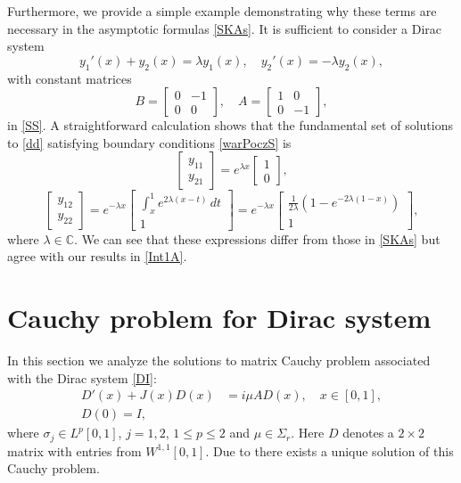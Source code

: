 \documentclass[11pt]{amsart}
\theoremstyle{plain}
\theoremstyle{definition}
\theoremstyle{remark}
\numberwithin{equation}{section}
\begin{document}
Furthermore, we provide a simple example demonstrating why these terms are necessary in the asymptotic formulas \eqref{SKAs}.
It is sufficient to consider a Dirac system
\begin{equation}\label{dd}
y_1'(x)+y_2(x)=\lambda y_1(x),\quad y_2'(x)=-\lambda y_2(x),
\end{equation}
with constant matrices
\begin{equation}
B=\left[ \begin{array}{cc}
0 & -1\\
0 &  0
\end{array}\right],\quad
A=\left[ \begin{array}{cc}
1 & 0\\
0 & -1
\end{array}\right],
\end{equation}
in \eqref{SS}.
A straightforward calculation shows that the fundamental set of solutions to \eqref{dd}
satisfying boundary conditions \eqref{warPoczS} is
\[\left[\begin{array}{c}
y_{11}
\\
y_{21}\end{array}\right]=
e^{\lambda x}\left[\begin{array}{c}
1\\
0\end{array}\right],
\]
\[
\left[\begin{array}{c}
y_{12}\\
y_{22}\end{array}\right]=
e^{-\lambda x}\left[\begin{array}{c}
\int_x^1 e^{2\lambda(x-t)}\,dt
\\
1\end{array}\right]=
e^{-\lambda x}\left[\begin{array}{c}
\frac{1}{2\lambda}(1-e^{-2\lambda(1-x)})
\\
1\end{array}\right],
\]
where $\lambda \in \mathbb{C}$. We can see that these expressions differ from those
in \eqref{SKAs} but agree with our results in \eqref{Int1A}.


\section{Cauchy problem for Dirac system}
In this section we analyze the solutions to matrix Cauchy problem
associated with the Dirac system \eqref{DI}:
\begin{align}\label{D0}
D'(x)+J(x) D(x)&= i \mu A D(x),\quad
 x\in [0,1],\\
 D(0)=I,
\end{align}
where $\sigma_j\in L^p[0,1]$, $j=1,2$, $1\leq p \leq 2$ and $\mu \in \Sigma_r$.
Here $D$ denotes a $2\times2$ matrix with entries from $W^{1,1}[0,1]$. Due to
\cite[Theorem 1.2.1]{Zettl} there exists a unique solution of this Cauchy problem.
\end{document}
